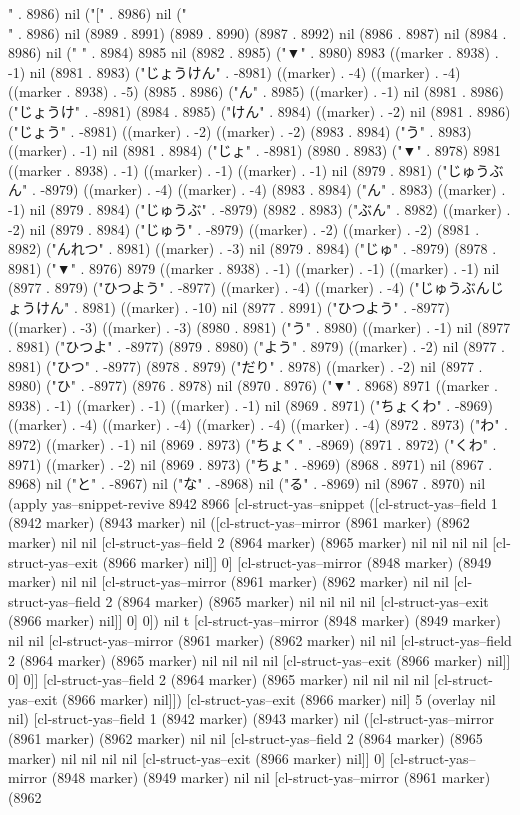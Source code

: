 " . 8986) nil ("[" . 8986) nil ("\\" . 8986) nil (8989 . 8991) (8989 . 8990) (8987 . 8992) nil (8986 . 8987) nil (8984 . 8986) nil (" " . 8984) 8985 nil (8982 . 8985) ("▼" . 8980) 8983 ((marker . 8938) . -1) nil (8981 . 8983) ("じょうけん" . -8981) ((marker) . -4) ((marker) . -4) ((marker . 8938) . -5) (8985 . 8986) ("ん" . 8985) ((marker) . -1) nil (8981 . 8986) ("じょうけ" . -8981) (8984 . 8985) ("けん" . 8984) ((marker) . -2) nil (8981 . 8986) ("じょう" . -8981) ((marker) . -2) ((marker) . -2) (8983 . 8984) ("う" . 8983) ((marker) . -1) nil (8981 . 8984) ("じょ" . -8981) (8980 . 8983) ("▼" . 8978) 8981 ((marker . 8938) . -1) ((marker) . -1) ((marker) . -1) nil (8979 . 8981) ("じゅうぶん" . -8979) ((marker) . -4) ((marker) . -4) (8983 . 8984) ("ん" . 8983) ((marker) . -1) nil (8979 . 8984) ("じゅうぶ" . -8979) (8982 . 8983) ("ぶん" . 8982) ((marker) . -2) nil (8979 . 8984) ("じゅう" . -8979) ((marker) . -2) ((marker) . -2) (8981 . 8982) ("んれつ" . 8981) ((marker) . -3) nil (8979 . 8984) ("じゅ" . -8979) (8978 . 8981) ("▼" . 8976) 8979 ((marker . 8938) . -1) ((marker) . -1) ((marker) . -1) nil (8977 . 8979) ("ひつよう" . -8977) ((marker) . -4) ((marker) . -4) ("じゅうぶんじょうけん" . 8981) ((marker) . -10) nil (8977 . 8991) ("ひつよう" . -8977) ((marker) . -3) ((marker) . -3) (8980 . 8981) ("う" . 8980) ((marker) . -1) nil (8977 . 8981) ("ひつよ" . -8977) (8979 . 8980) ("よう" . 8979) ((marker) . -2) nil (8977 . 8981) ("ひつ" . -8977) (8978 . 8979) ("だり" . 8978) ((marker) . -2) nil (8977 . 8980) ("ひ" . -8977) (8976 . 8978) nil (8970 . 8976) ("▼" . 8968) 8971 ((marker . 8938) . -1) ((marker) . -1) ((marker) . -1) nil (8969 . 8971) ("ちょくわ" . -8969) ((marker) . -4) ((marker) . -4) ((marker) . -4) ((marker) . -4) (8972 . 8973) ("わ" . 8972) ((marker) . -1) nil (8969 . 8973) ("ちょく" . -8969) (8971 . 8972) ("くわ" . 8971) ((marker) . -2) nil (8969 . 8973) ("ちょ" . -8969) (8968 . 8971) nil (8967 . 8968) nil ("と" . -8967) nil ("な" . -8968) nil ("る" . -8969) nil (8967 . 8970) nil (apply yas--snippet-revive 8942 8966 [cl-struct-yas--snippet ([cl-struct-yas--field 1 (8942 marker) (8943 marker) nil ([cl-struct-yas--mirror (8961 marker) (8962 marker) nil nil [cl-struct-yas--field 2 (8964 marker) (8965 marker) nil nil nil nil [cl-struct-yas--exit (8966 marker) nil]] 0] [cl-struct-yas--mirror (8948 marker) (8949 marker) nil nil [cl-struct-yas--mirror (8961 marker) (8962 marker) nil nil [cl-struct-yas--field 2 (8964 marker) (8965 marker) nil nil nil nil [cl-struct-yas--exit (8966 marker) nil]] 0] 0]) nil t [cl-struct-yas--mirror (8948 marker) (8949 marker) nil nil [cl-struct-yas--mirror (8961 marker) (8962 marker) nil nil [cl-struct-yas--field 2 (8964 marker) (8965 marker) nil nil nil nil [cl-struct-yas--exit (8966 marker) nil]] 0] 0]] [cl-struct-yas--field 2 (8964 marker) (8965 marker) nil nil nil nil [cl-struct-yas--exit (8966 marker) nil]]) [cl-struct-yas--exit (8966 marker) nil] 5 (overlay nil nil) [cl-struct-yas--field 1 (8942 marker) (8943 marker) nil ([cl-struct-yas--mirror (8961 marker) (8962 marker) nil nil [cl-struct-yas--field 2 (8964 marker) (8965 marker) nil nil nil nil [cl-struct-yas--exit (8966 marker) nil]] 0] [cl-struct-yas--mirror (8948 marker) (8949 marker) nil nil [cl-struct-yas--mirror (8961 marker) (8962 
